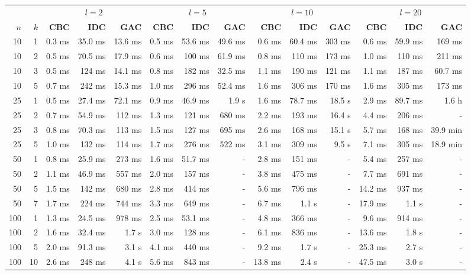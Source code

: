 \begin{table}
  \begin{center}
  \scriptsize
  \begin{tabular}{|rr | rrr| rrr| rrr| rrr|}
  \hline
   &&\multicolumn{3}{c|}{$l=2$} &\multicolumn{3}{c|}{$l=5$} &\multicolumn{3}{c|}{$l=10$} &\multicolumn{3}{c|}{$l=20$}\\
   \bfseries $n$ & \bfseries $k$
&   \bfseries CBC& \bfseries IDC& \bfseries GAC
&   \bfseries CBC& \bfseries IDC& \bfseries GAC
&   \bfseries CBC& \bfseries IDC& \bfseries GAC
&   \bfseries CBC& \bfseries IDC& \bfseries GAC
\\\hline
10&1&
0.3 ms&35.0 ms&13.6 ms&0.5 ms&53.6 ms&49.6 ms&0.6 ms&60.4 ms&303 ms&0.6 ms&59.9 ms&169 ms\\
10&2&
0.5 ms&70.5 ms&17.9 ms&0.6 ms&100 ms&61.9 ms&0.8 ms&110 ms&173 ms&1.0 ms&110 ms&211 ms\\
10&3&
0.5 ms&124 ms&14.1 ms&0.8 ms&182 ms&32.5 ms&1.1 ms&190 ms&121 ms&1.1 ms&187 ms&60.7 ms\\
10&5&
0.7 ms&242 ms&15.3 ms&1.0 ms&296 ms&52.4 ms&1.6 ms&306 ms&170 ms&1.6 ms&305 ms&173 ms\\
\hline
25&1&
0.5 ms&27.4 ms&72.1 ms&0.9 ms&46.9 ms&1.9 s&1.6 ms&78.7 ms&18.5 s&2.9 ms&89.7 ms&1.6 h\\
25&2&
0.7 ms&54.9 ms&112 ms&1.3 ms&121 ms&680 ms&2.2 ms&193 ms&16.4 s&4.4 ms&206 ms&-\\
25&3&
0.8 ms&70.3 ms&113 ms&1.5 ms&127 ms&695 ms&2.6 ms&168 ms&15.1 s&5.7 ms&168 ms&39.9 min\\
25&5&
1.0 ms&132 ms&114 ms&1.7 ms&276 ms&522 ms&3.1 ms&309 ms&9.5 s&7.1 ms&305 ms&18.9 min\\
\hline
50&1&
0.8 ms&25.9 ms&273 ms&1.6 ms&51.7 ms&-&2.8 ms&151 ms&-&5.4 ms&257 ms&-\\
50&2&
1.1 ms&46.9 ms&557 ms&2.0 ms&157 ms&-&3.8 ms&475 ms&-&7.7 ms&691 ms&-\\
50&5&
1.5 ms&142 ms&680 ms&2.8 ms&414 ms&-&5.6 ms&796 ms&-&14.2 ms&937 ms&-\\
50&7&
1.7 ms&224 ms&744 ms&3.3 ms&649 ms&-&6.7 ms&1.1 s&-&17.9 ms&1.1 s&-\\
\hline
100&1&
1.3 ms&24.5 ms&978 ms&2.5 ms&53.1 ms&-&4.8 ms&366 ms&-&9.6 ms&914 ms&-\\
100&2&
1.6 ms&32.4 ms&1.7 s&3.0 ms&128 ms&-&6.1 ms&836 ms&-&13.6 ms&1.8 s&-\\
100&5&
2.0 ms&91.3 ms&3.1 s&4.1 ms&440 ms&-&9.2 ms&1.7 s&-&25.3 ms&2.7 s&-\\
100&10&
2.6 ms&248 ms&4.1 s&5.6 ms&843 ms&-&13.8 ms&2.4 s&-&47.5 ms&3.0 s&-\\

\end{tabular}
\end{center}
\end{table}
